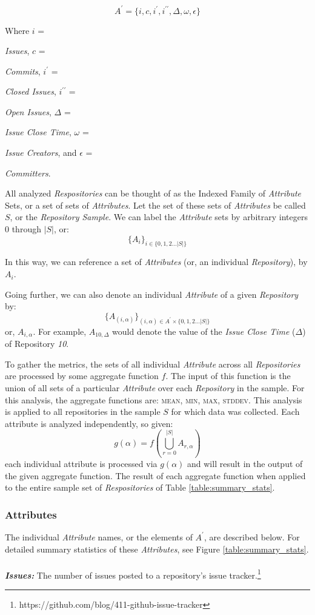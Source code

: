\documentclass{proc}
\begin{document}
\[A^\prime = \{i, c, i^\prime, i^{\prime\prime}, \Delta, \omega, \epsilon\}\]

Where $i$ = {\textit{Issues}, $c$ = {\textit{Commits}, $i^\prime$ = {\textit{Closed Issues}, $i^{\prime\prime}$ = {\textit{Open Issues}, $\Delta$ = {\textit{Issue Close Time}, $\omega$ = {\textit{Issue Creators}, and $\epsilon$ = {\textit{Committers}.

All analyzed \textit{Respositories} can be thought of as the Indexed Family of \textit{Attribute} Sets, or a set of sets of \textit{Attributes}. Let the set of these sets of \textit{Attributes} be called $S$, or the \textit{Repository Sample}. We can label the \textit{Attribute} sets by arbitrary integers 0 through $|S|$, or:
\[ \{A_i\}_{i \in \{0,1,2 ... |S|\} }\]

In this way, we can reference a set of \textit{Attributes} (or, an individual \textit{Repository}), by $A_i$. 

Going further, we can also denote an individual \textit{Attribute} of a given \textit{Repository} by:
\[ \{A_{(i,\alpha)}\}_{(i,\alpha) \in A^\prime \times \{0,1,2 ... |S|\} } \]
or, $A_{i,\alpha}$. For example, $A_{10,\Delta}$ would denote the value of the \textit{Issue Close Time} ($\Delta$) of Repository \textit{10}.

To gather the metrics, the sets of all individual \textit{Attribute} across all \textit{Repositories} are processed by some aggregate function $f$. The input of this function is the union of all sets of a particular \textit{Attribute} over each \textit{Repository} in the sample. For this analysis, the aggregate functions are: \textsc{mean}, \textsc{min}, \textsc{max}, \textsc{stddev}. This analysis is applied to all repositories in the sample $S$ for which data was collected. Each attribute is analyzed independently, so given:
\[ g(\alpha) =f \left( \bigcup\limits_{r = 0}^{|S|}  A_{r,\alpha} \right) \]
each individual attribute is processed via $g(\alpha)$ and will result in the output of the given aggregate function. The result of each aggregate function when applied to the entire sample set of \textit{Respositories} of Table \ref{table:summary_stats}.

\subsubsection{Attributes}
\label{sec:attributes}
The individual \textit{Attribute} names, or the elements of $A^\prime$, are described below. For detailed summary statistics of these \textit{Attributes}, see Figure \ref{table:summary_stats}.\\\\
\noindent \textbf{\textit{Issues:}}
The number of issues posted to a repository's issue tracker.\footnote{https://github.com/blog/411-github-issue-tracker}

}}}}}}}
\end{document}
